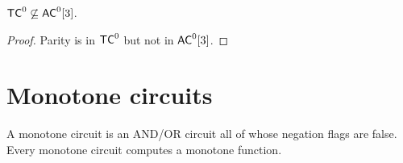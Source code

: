 \begin{corollary}
  \label{cor:lowerbounds-tc0-not-subset-acc3}
  \leanok
  $\mathsf{TC}^0 \not\subseteq \mathsf{AC}^0[3]$.
\end{corollary}
\begin{proof}
  \leanok
  Parity is in $\mathsf{TC}^0$ but not in $\mathsf{AC}^0[3]$.
\end{proof}

\section{Monotone circuits}
\label{sec:lowerbounds-monotone}

\begin{definition}
  \label{def:lowerbounds-monotone-circuit}
  A monotone circuit is an AND/OR circuit all of whose negation flags are
  false. Every monotone circuit computes a monotone function.
\end{definition}

